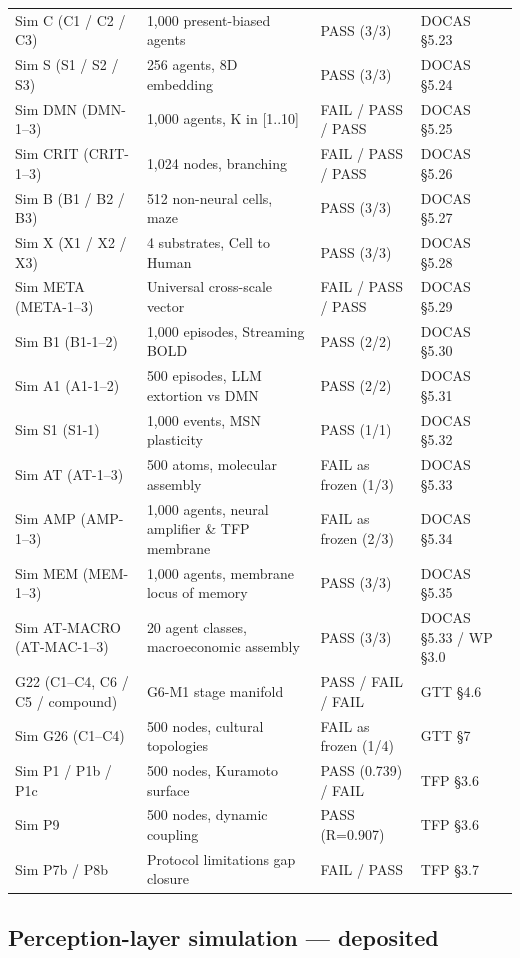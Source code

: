 \documentclass[11pt]{article}
\begin{document}
{\begin{tabular}{@{}p{3.4cm}lp{4.5cm}l@{}}
Sim C (C1 / C2 / C3) & 1,000 present-biased agents & PASS (3/3) & DOCAS \S{}5.23 \\
Sim S (S1 / S2 / S3) & 256 agents, 8D embedding & PASS (3/3) & DOCAS \S{}5.24 \\
Sim DMN (DMN-1--3) & 1,000 agents, K in [1..10] & FAIL / PASS / PASS & DOCAS \S{}5.25 \\
Sim CRIT (CRIT-1--3) & 1,024 nodes, branching & FAIL / PASS / PASS & DOCAS \S{}5.26 \\
Sim B (B1 / B2 / B3) & 512 non-neural cells, maze & PASS (3/3) & DOCAS \S{}5.27 \\
Sim X (X1 / X2 / X3) & 4 substrates, Cell to Human & PASS (3/3) & DOCAS \S{}5.28 \\
Sim META (META-1--3) & Universal cross-scale vector & FAIL / PASS / PASS & DOCAS \S{}5.29 \\
Sim B1 (B1-1--2) & 1,000 episodes, Streaming BOLD & PASS (2/2) & DOCAS \S{}5.30 \\
Sim A1 (A1-1--2) & 500 episodes, LLM extortion vs DMN & PASS (2/2) & DOCAS \S{}5.31 \\
Sim S1 (S1-1) & 1,000 events, MSN plasticity & PASS (1/1) & DOCAS \S{}5.32 \\
Sim AT (AT-1--3) & 500 atoms, molecular assembly & FAIL as frozen (1/3) & DOCAS \S{}5.33 \\
Sim AMP (AMP-1--3) & 1,000 agents, neural amplifier \& TFP membrane & FAIL as frozen (2/3) & DOCAS \S{}5.34 \\
Sim MEM (MEM-1--3) & 1,000 agents, membrane locus of memory & PASS (3/3) & DOCAS \S{}5.35 \\
Sim AT-MACRO (AT-MAC-1--3) & 20 agent classes, macroeconomic assembly & PASS (3/3) & DOCAS \S{}5.33 / WP \S{}3.0 \\
G22 (C1--C4, C6 / C5 / compound) & G6-M1 stage manifold & PASS / FAIL / FAIL & GTT \S{}4.6 \\
Sim G26 (C1--C4) & 500 nodes, cultural topologies & FAIL as frozen (1/4) & GTT \S{}7 \\
Sim P1 / P1b / P1c & 500 nodes, Kuramoto surface & PASS (0.739) / FAIL & TFP \S{}3.6 \\
Sim P9 & 500 nodes, dynamic coupling & PASS (R=0.907) & TFP \S{}3.6 \\
Sim P7b / P8b & Protocol limitations gap closure & FAIL / PASS & TFP \S{}3.7 \\
\hline
\end{tabular}}

\subsection*{Perception-layer simulation --- deposited}
\end{document}
